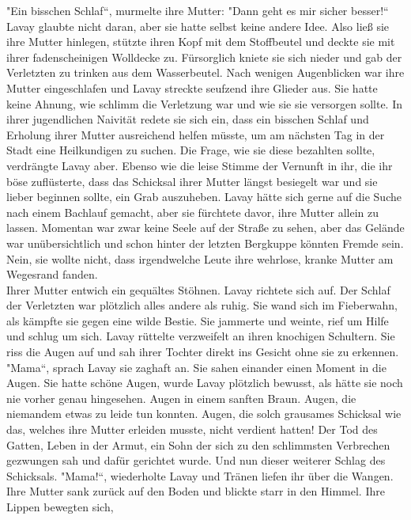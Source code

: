 "Ein bisschen Schlaf``, murmelte ihre Mutter: "Dann geht es mir sicher besser!``\\
Lavay glaubte nicht daran, aber sie hatte selbst keine andere Idee. Also ließ sie ihre Mutter 
hinlegen, stützte ihren Kopf mit dem Stoffbeutel und deckte sie mit ihrer fadenscheinigen Wolldecke 
zu. Fürsorglich kniete sie sich nieder und gab der Verletzten zu trinken aus dem Wasserbeutel. Nach 
wenigen Augenblicken war ihre Mutter eingeschlafen und Lavay streckte seufzend ihre Glieder aus. 
Sie hatte keine Ahnung, wie schlimm die Verletzung war und wie sie sie versorgen sollte. In ihrer 
jugendlichen Naivität redete sie sich ein, dass ein bisschen Schlaf und Erholung ihrer Mutter 
ausreichend helfen müsste, um am nächsten Tag in der Stadt eine Heilkundigen zu suchen. Die 
Frage, wie sie diese bezahlten sollte, verdrängte Lavay aber. Ebenso wie die leise Stimme der 
Vernunft in ihr, die ihr böse zuflüsterte, dass das Schicksal ihrer Mutter längst besiegelt war und 
sie lieber beginnen sollte, ein Grab auszuheben. Lavay hätte sich gerne auf die Suche nach einem 
Bachlauf gemacht, aber sie fürchtete davor, ihre Mutter allein zu lassen. Momentan war zwar keine 
Seele auf der Straße zu sehen, aber das Gelände war unübersichtlich und schon hinter der letzten 
Bergkuppe könnten Fremde sein. Nein, sie wollte nicht, dass irgendwelche Leute ihre wehrlose, 
kranke Mutter am Wegesrand fanden.\\
Ihrer Mutter entwich ein gequältes Stöhnen. Lavay richtete sich auf. Der Schlaf der Verletzten war 
plötzlich alles andere als ruhig. Sie wand sich im Fieberwahn, als kämpfte sie gegen eine wilde 
Bestie. Sie jammerte und weinte, rief um Hilfe und schlug um sich. Lavay rüttelte verzweifelt an 
ihren knochigen Schultern. Sie riss die Augen auf und sah ihrer Tochter direkt ins Gesicht ohne sie 
zu erkennen.\\
"Mama``, sprach Lavay sie zaghaft an. Sie sahen einander einen Moment in die Augen. Sie hatte 
schöne Augen, wurde Lavay plötzlich bewusst, als hätte sie noch nie vorher genau hingesehen. Augen 
in einem sanften Braun. Augen, die niemandem etwas zu leide tun konnten. Augen, die solch grausames 
Schicksal wie das, welches ihre Mutter erleiden musste, nicht verdient hatten! Der Tod des Gatten, 
Leben in der Armut, ein Sohn der sich zu den schlimmsten Verbrechen gezwungen sah und dafür 
gerichtet wurde. Und nun dieser weiterer Schlag des Schicksals. "Mama!``, wiederholte Lavay und 
Tränen liefen ihr über die Wangen.\\
Ihre Mutter sank zurück auf den Boden und blickte starr in den Himmel. Ihre Lippen bewegten sich, 
